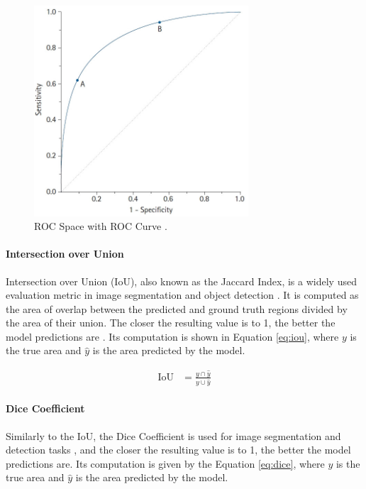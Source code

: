 \begin{figure}[H]
\begin{centering}
\includegraphics[width=8cm]{assets/images/roc-space.jpg}
\par\end{centering}
\caption{ROC Space with ROC Curve \cite{Nahm2022}.}
\label{fig:roc}
\end{figure}

\paragraph{Intersection over Union} Intersection over Union (IoU), also known as the Jaccard Index, is a widely used evaluation metric in image segmentation and object detection \cite{Rezatofighi2019}. It is computed as the area of overlap between the predicted and ground truth regions divided by the area of their union. The closer the resulting value is to 1, the better the model predictions are \cite{Rezatofighi2019}. Its computation is shown in Equation \ref{eq:iou}, where $y$ is the true area and $\hat{y}$ is the area predicted by the model.

\begin{align}
\label{eq:iou}
\text{IoU} &= \frac{y \cap \hat{y}}{y \cup \hat{y}}
\end{align}

\paragraph{Dice Coefficient} Similarly to the IoU, the Dice Coefficient is used for image segmentation and detection tasks \cite{Hu2023}, and the closer the resulting value is to 1, the better the model predictions are. Its computation is given by the Equation \ref{eq:dice}, where $y$ is the true area and $\hat{y}$ is the area predicted by the model.

